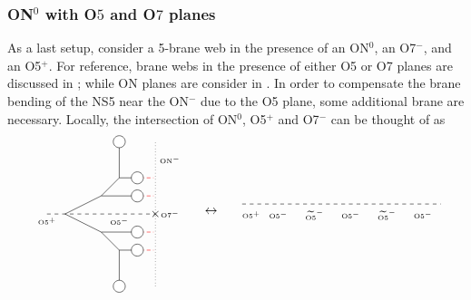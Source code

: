 \documentclass[a4paper,11pt]{article}
\def\SevenB#1{
	\node[circle, draw, fill=white] at (#1){};
}
\def\monocut#1#2{
    \draw[dashdotted,red] (#1)--(#2);
}
\begin{document}
\subsubsection{\texorpdfstring{ON${}^0$ with O$5$ and O$7$ planes}{ON with O5 and O7 planes}}
\label{sec:5d_ON_and_Op}
As a last setup, consider a 5-brane web in the presence of an ON${}^0$, an O7$^-$, and an O5${}^+$. For reference, brane webs in the presence of either O5 or O7 planes are discussed in \cite{Brunner:1997gk,DeWolfe:1999hj,Zafrir:2015ftn,Bergman:2015dpa}; while ON planes are consider in \cite{Sen:1998rg,Sen:1998ii,Kapustin:1998fa,Hanany:1999sj,Hayashi:2015vhy}.
In order to compensate the brane bending of the NS5 near the ON${}^-$ due to the O5 plane, some additional brane are necessary.
Locally, the intersection of ON${}^0$, O5${}^+$ and O7${}^-$ can be thought of as 
\begin{subequations}
    \label{eq:intersection_O5s}
\begin{align}
    \raisebox{-.5\height}{
    \begin{tikzpicture}
    \draw[dashed] (-3,0)--(0,0);
    \node at (-3,-0.2) {\tiny{O5${}^+$}};
    \node at (-1,-0.2) {\tiny{O5${}^-$}};
    \draw[dotted] (0,-2)--(0,2);
    \node at (0.4,1.5) {\tiny{ON${}^-$}};
    \draw (-1,2)--(-1,1)--(-1.5,0.5)--(-2.5,0);
    \draw (-1,1)--(-0.5,1) (-1.5,0.5)--(-0.5,0.5);
    \SevenB{-1,2}
    \monocut{-0.5,1}{0,1}
    \monocut{-0.5,0.5}{0,0.5}
    \SevenB{-0.5,1}
    \SevenB{-0.5,0.5}
    \node at (0,0) {$\times$};
    \node at (0.4,0) {\tiny{O7${}^-$}};
    \begin{scope}[yscale=-1,xscale=1]
    \draw (-1,2)--(-1,1)--(-1.5,0.5)--(-2.5,0);
    \draw (-1,1)--(-0.5,1) (-1.5,0.5)--(-0.5,0.5);
    \SevenB{-1,2}
    \monocut{-0.5,1}{0,1}
    \monocut{-0.5,0.5}{0,0.5}
    \SevenB{-0.5,1}
    \SevenB{-0.5,0.5}
  \end{scope}
    \end{tikzpicture}
    }
% 
    \quad \leftrightarrow \quad 
% 
    \raisebox{-.5\height}{
    \begin{tikzpicture}
    \draw[dashed] (-5.5,0)--(0,0);
    \node at (-5.25,-0.3) {\tiny{O5${}^+$}};
    \node at (-4.5,-0.3) {\tiny{O5${}^-$}};
    \node at (-3.5,-0.3) {\tiny{$\widetilde{\text{O5}}^-$}};
    \node at (-2.5,-0.3) {\tiny{O5${}^-$}};
    \node at (-1.5,-0.3) {\tiny{$\widetilde{\text{O5}}^-$}};
    \node at (-0.5,-0.3) {\tiny{O5${}^-$}};

\end{tikzpicture}}
\end{align}
\end{subequations}
\end{document}
